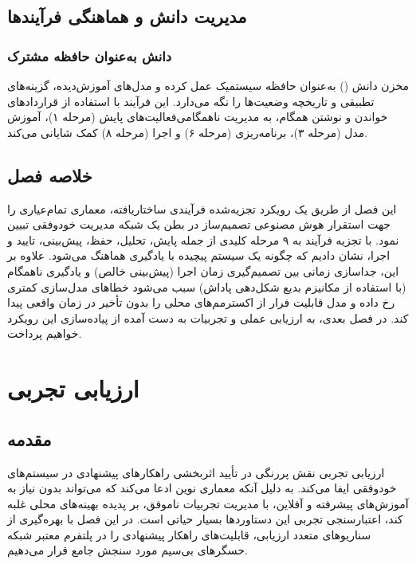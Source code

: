 \documentclass[oneside,openany,phd]{TMU-Thesis}
\begin{document}
\section{مدیریت دانش و هماهنگی فرآیندها}

\subsection{دانش به‌عنوان حافظه مشترک}

مخزن دانش () به‌عنوان حافظه سیستمیک عمل کرده و مدل‌های آموزش‌دیده، گزینه‌های تطبیقی و تاریخچه وضعیت‌ها را نگه می‌دارد. این فرآیند با استفاده از قراردادهای خواندن و نوشتن همگام، به مدیریت ناهمگامی‌فعالیت‌های پایش (مرحله ۱)، آموزش مدل (مرحله ۳)، برنامه‌ریزی (مرحله ۶) و اجرا (مرحله ۸) کمک شایانی می‌کند.

\section{خلاصه فصل}

این فصل از طریق یک رویکرد تجزیه‌شده فرآیندی ساختاریافته، معماری تمام‌عیاری را جهت استقرار هوش مصنوعی تصمیم‌ساز در بطن یک شبکه مدیریت خودوفقی تبیین نمود. با تجزیه فرآیند به ۹ مرحله کلیدی از جمله پایش، تحلیل، حفظ، پیش‌بینی، تایید و اجرا، نشان دادیم که چگونه یک سیستم پیچیده  با یادگیری  هماهنگ می‌شود. علاوه بر این، جداسازی زمانی بین تصمیم‌گیری زمان اجرا (پیش‌بینی خالص) و یادگیری ناهمگام (با استفاده از مکانیزم بدیع شکل‌دهی پاداش) سبب می‌شود خطاهای مدل‌سازی کمتری رخ داده و مدل قابلیت فرار از اکسترمم‌های محلی را بدون تأخیر در زمان واقعی پیدا کند. در فصل بعدی، به ارزیابی عملی و تجربیات به دست آمده از پیاده‌سازی این رویکرد خواهیم پرداخت.

\chapter{ارزیابی تجربی}
\section{مقدمه}

ارزیابی تجربی نقش پررنگی در تأیید اثربخشی راهکارهای پیشنهادی در سیستم‌های خودوفقی ایفا می‌کند. به دلیل آنکه معماری نوین  ادعا می‌کند که می‌تواند بدون نیاز به آموزش‌های پیشرفته و آفلاین، با مدیریت تجربیات ناموفق، بر پدیده بهینه‌های محلی غلبه کند، اعتبارسنجی تجربی این دستاوردها بسیار حیاتی است. در این فصل با بهره‌گیری از سناریوهای متعدد ارزیابی، قابلیت‌های راهکار پیشنهادی را در پلتفرم معتبر شبکه حسگرهای بی‌سیم  مورد سنجش جامع قرار می‌دهیم. 
\end{document}
